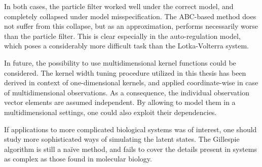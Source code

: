 In both cases, the particle filter worked well under the correct model, and completely collapsed under model misspecification. The ABC-based method does not suffer from this collapse, but as an approximation, performs necessarily worse than the particle filter. This is clear especially in the auto-regulation model, which poses a considerably more difficult task than the Lotka-Volterra system.

In future, the possibility to use multidimensional kernel functions could be considered. The kernel width tuning procedure utilized in this thesis has been derived in context of one-dimensional kernels, and applied coordinate-wise in case of multidimensional observations. As a consequence, the individual observation vector elements are assumed independent. By allowing to model them in a multidimensional settings, one could also exploit their dependencies.

If applications to more complicated biological systems was of interest, one should study more sophisticated ways of simulating the latent states. The Gillespie algorithm is still a naïve method, and fails to cover the details present in systems as complex as those found in molecular biology.